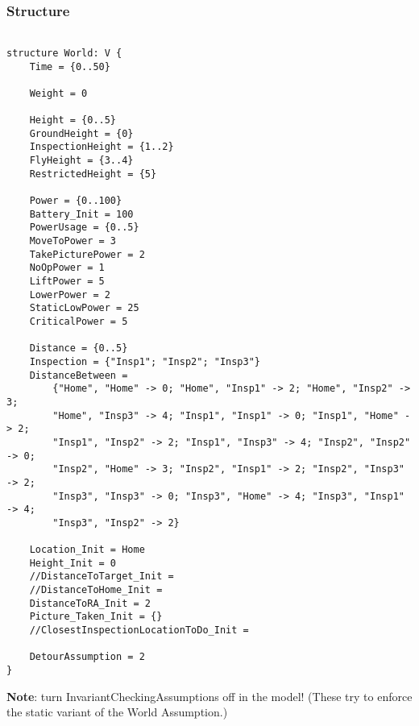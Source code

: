 \documentclass[12pt]{extarticle}
\begin{document}
\subsubsection*{Structure}
\begin{lstlisting}[basicstyle=\tiny]

structure World: V {
    Time = {0..50}
    
    Weight = 0

    Height = {0..5}
    GroundHeight = {0}
    InspectionHeight = {1..2}
    FlyHeight = {3..4}
    RestrictedHeight = {5}
    
    Power = {0..100}
    Battery_Init = 100
    PowerUsage = {0..5}
    MoveToPower = 3
    TakePicturePower = 2
    NoOpPower = 1
    LiftPower = 5
    LowerPower = 2
    StaticLowPower = 25
    CriticalPower = 5
    
    Distance = {0..5}
    Inspection = {"Insp1"; "Insp2"; "Insp3"}
    DistanceBetween =
    	{"Home", "Home" -> 0; "Home", "Insp1" -> 2; "Home", "Insp2" -> 3;
    	"Home", "Insp3" -> 4; "Insp1", "Insp1" -> 0; "Insp1", "Home" -> 2;
    	"Insp1", "Insp2" -> 2; "Insp1", "Insp3" -> 4; "Insp2", "Insp2" -> 0;
    	"Insp2", "Home" -> 3; "Insp2", "Insp1" -> 2; "Insp2", "Insp3" -> 2;
    	"Insp3", "Insp3" -> 0; "Insp3", "Home" -> 4; "Insp3", "Insp1" -> 4;
    	"Insp3", "Insp2" -> 2}

    Location_Init = Home
    Height_Init = 0
    //DistanceToTarget_Init =
    //DistanceToHome_Init =
    DistanceToRA_Init = 2
    Picture_Taken_Init = {}
    //ClosestInspectionLocationToDo_Init =
    
    DetourAssumption = 2
}
\end{lstlisting}

\noindent
\textbf{Note}: turn InvariantCheckingAssumptions off in the model! (These try to enforce the static variant of the World Assumption.)\\
\end{document}
